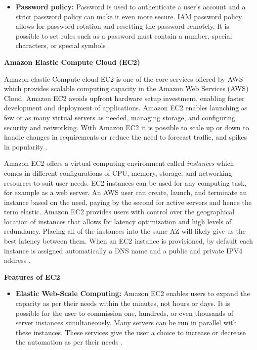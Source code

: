 \begin{itemize}
    \item \textbf{Password policy:} Password is used to authenticate a user’s account and a strict password policy
    can make it
    even more secure. IAM password policy allows for password rotation and resetting the password remotely. It is
    possible to set rules such as a password must contain a number, special characters, or special symbols \cite{25}.
\end{itemize}


\textbf{Amazon Elastic Compute Cloud (EC2)}

\par Amazon elastic Compute cloud EC2 is one of the core services offered by AWS which provides scalable computing
capacity in the Amazon Web Services (AWS) Cloud. Amazon EC2 avoids upfront hardware setup investment, enabling faster
development and deployment of applications. Amazon EC2 enables launching as few or as many virtual servers as needed,
managing storage, and configuring security and networking. With Amazon EC2 it is possible to scale up or down to
handle changes in requirements or reduce the need to forecast traffic, and spikes in popularity \cite{27}.

\par Amazon EC2 offers a virtual computing environment called \textit{instances} which comes in different configurations of CPU, memory, storage, and networking resources to suit user needs. EC2 instances can be used for any computing task, for example as a web server. An AWS user can create, launch, and terminate an instance based on the need, paying by the second for active servers and hence the term elastic. Amazon EC2 provides users with control over the geographical location of instances that allows for latency optimization and high levels of redundancy. Placing all of the instances into the same AZ will likely give us the best latency between them. When an EC2 instance is provisioned, by default each instance is assigned automatically a DNS name and a public and private IPV4 address \cite{28}.

\textbf{Features of EC2}
\begin{itemize}
    \item \textbf{Elastic Web-Scale Computing:} Amazon EC2 enables users to expand the capacity as per their needs within the minutes, not hours or days. It is possible for the user to commission one, hundreds, or even thousands of server instances simultaneously. Many servers can be run in parallel with these instances. These services give the user a choice to increase or decrease the automation as per their needs \cite{29}.
\end{itemize}

